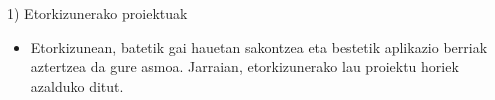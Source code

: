 \documentclass[
 10pt,%
 compress,%
 t,       %
 xcolor=svgnames
]{beamer}
\theoremstyle{definition} \newtheorem{definicion}{Definicion}[section]
\theoremstyle{propiedades} \newtheorem{propiedades}{Propiedades}[section]
\begin{document}
\begin{frame}{1) Etorkizunerako proiektuak}
{\begin{itemize}
\begin{itemize}
	\end{itemize}
	
	\medskip
	
	\item Etorkizunean, batetik gai hauetan sakontzea eta bestetik aplikazio berriak aztertzea da gure asmoa. Jarraian, etorkizunerako lau proiektu horiek azalduko ditut.
	
	
		
	
\end{itemize}




}

\end{frame}




	
	
	
	
	
 
	
\end{document}
